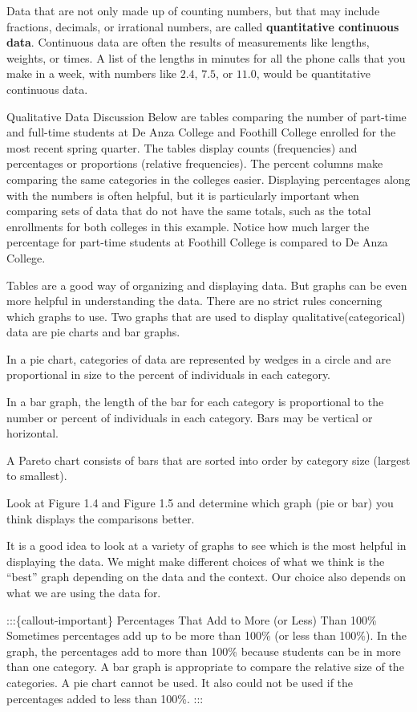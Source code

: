 \documentclass[
  letterpaper,
  DIV=11,
  numbers=noendperiod]{scrreprt}
\begin{document}
Data that are not only made up of counting numbers, but that may include
fractions, decimals, or irrational numbers, are called
\textbf{quantitative continuous data}. Continuous data are often the
results of measurements like lengths, weights, or times. A list of the
lengths in minutes for all the phone calls that you make in a week, with
numbers like \(2.4\), \(7.5\), or \(11.0\), would be quantitative
continuous data.

Qualitative Data Discussion Below are tables comparing the number of
part-time and full-time students at De Anza College and Foothill College
enrolled for the most recent spring quarter. The tables display counts
(frequencies) and percentages or proportions (relative frequencies). The
percent columns make comparing the same categories in the colleges
easier. Displaying percentages along with the numbers is often helpful,
but it is particularly important when comparing sets of data that do not
have the same totals, such as the total enrollments for both colleges in
this example. Notice how much larger the percentage for part-time
students at Foothill College is compared to De Anza College.

Tables are a good way of organizing and displaying data. But graphs can
be even more helpful in understanding the data. There are no strict
rules concerning which graphs to use. Two graphs that are used to
display qualitative(categorical) data are pie charts and bar graphs.

In a pie chart, categories of data are represented by wedges in a circle
and are proportional in size to the percent of individuals in each
category.

In a bar graph, the length of the bar for each category is proportional
to the number or percent of individuals in each category. Bars may be
vertical or horizontal.

A Pareto chart consists of bars that are sorted into order by category
size (largest to smallest).

Look at Figure 1.4 and Figure 1.5 and determine which graph (pie or bar)
you think displays the comparisons better.

It is a good idea to look at a variety of graphs to see which is the
most helpful in displaying the data. We might make different choices of
what we think is the ``best'' graph depending on the data and the
context. Our choice also depends on what we are using the data for.

:::\{callout-important\} Percentages That Add to More (or Less) Than
100\% Sometimes percentages add up to be more than 100\% (or less than
100\%). In the graph, the percentages add to more than 100\% because
students can be in more than one category. A bar graph is appropriate to
compare the relative size of the categories. A pie chart cannot be used.
It also could not be used if the percentages added to less than 100\%.
:::
\end{document}
